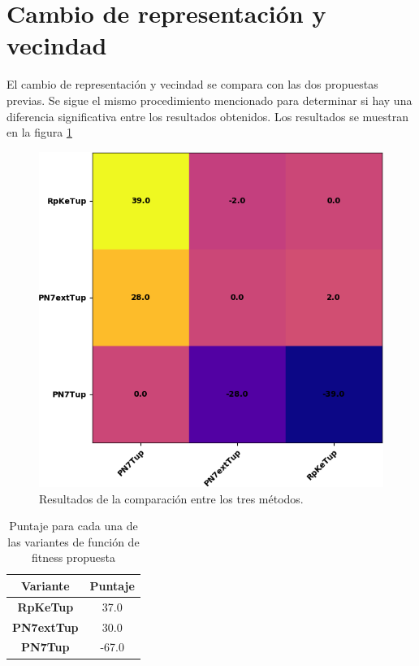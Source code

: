 \section{Cambio de representación y vecindad}
El cambio de representación y vecindad se compara con las dos propuestas previas. Se sigue el mismo procedimiento mencionado para determinar si hay una diferencia significativa entre los resultados obtenidos. Los resultados se muestran en la figura \ref{fig:n7vsn8vspr}
\begin{figure}[hbtp]
    \centering
    \includegraphics[scale=.7]{Imagenes/prn7n8comp.png}
    \caption{Resultados de la comparación entre los tres métodos.}
    \label{fig:n7vsn8vspr}
\end{figure}

\begin{table}[hbtp]
    \centering
\begin{tabular}{@{}cc@{}}
Variante & Puntaje \\ \midrule
\toprule
    \textbf{RpKeTup} & 37.0 \\ \midrule
    \textbf{PN7extTup} & 30.0 \\ \midrule
    \textbf{PN7Tup} & -67.0 \\ \midrule
\end{tabular}
    \caption{Puntaje para cada una de las variantes de función de fitness propuesta}
    \label{tab:n7n8pr}
\end{table}


